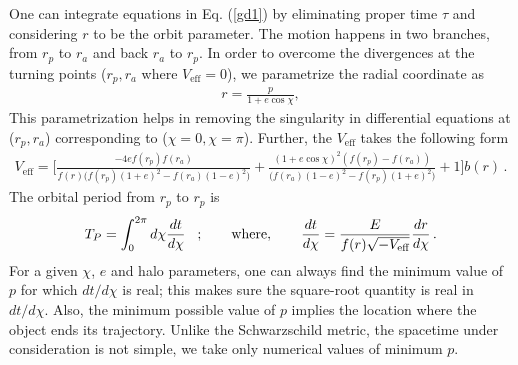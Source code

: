 \documentclass[11pt]{article}
\begin{document}
One can integrate equations in Eq. (\ref{gd1}) by eliminating proper time $\tau$ and considering $r$ to be the orbit parameter. The motion happens in two branches, from $r_{p}$ to $r_{a}$ and back $r_{a}$ to $r_{p}$. In order to overcome the divergences at the turning points ($r_{p},r_{a}$ where $V_{\textrm{eff}}=0$), we parametrize the radial coordinate as
\begin{align}
    r = \frac{p}{1+e\cos\chi},
\end{align}
This parametrization helps in removing the singularity in differential equations at ($r_{p}, r_{a}$) corresponding to ($\chi=0, \chi=\pi$). Further, the $V_{\textrm{eff}}$ takes the following form
\begin{align}
    V_{\textrm{eff}} = \Bigg[\frac{-4ef(r_{p})f(r_{a})}{f(r) \Big(f(r_{p})(1+e)^{2}-f(r_{a})(1-e)^{2}\Big)}+ \frac{(1+e\cos\chi)^{2} (f(r_{p})-f(r_{a}))}{\Big(f(r_{a})(1-e)^{2}-f(r_{p})(1+e)^{2}\Big)}+1\Bigg]b(r)\,.
\end{align}
The orbital period from $r_{p}$ to $r_{p}$ is
\begin{align}
    T_{P} = \int_{0}^{2\pi}d\chi \frac{dt}{d\chi} \hspace{3mm} ; \hspace{7mm} \textup{where}, \hspace{7mm} \frac{dt}{d\chi} = \frac{E}{f(r)\sqrt{-V_{\textrm{eff}}}}\frac{dr}{d\chi}\,.
\end{align}
 For a given $\chi$, $e$ and halo parameters, one can always find the minimum value of $p$ for which $dt/d\chi$ is real; this makes sure the square-root quantity is real in $dt/d\chi$. Also, the minimum possible value of $p$ implies the location where the object ends its trajectory. Unlike the Schwarzschild metric, the spacetime under consideration is not simple, we take only numerical values of minimum $p$. \par
\end{document}
